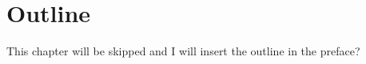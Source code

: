\chapter{Outline }\label{ch:introduction}
This chapter will be skipped and I will insert the outline in the preface?